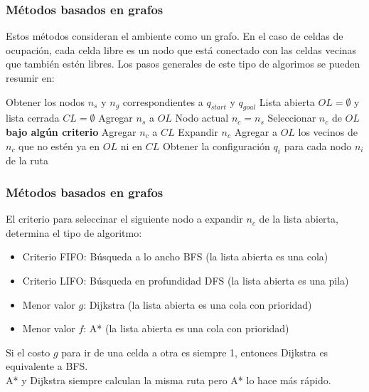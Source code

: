 \begin{frame}\frametitle{Métodos basados en grafos}
  Estos métodos consideran el ambiente como un grafo. En el caso de celdas de ocupación, cada celda libre es un nodo que está conectado con las celdas vecinas que también estén libres. Los pasos generales de este tipo de algorimos se pueden resumir en:
  \[\]
  \begin{algorithm}[H]
    \footnotesize
    \DontPrintSemicolon
    Obtener los nodos $n_s$ y $n_g$ correspondientes a $q_{start}$ y $q_{goal}$\;
    Lista abierta $OL = \emptyset$ y lista cerrada $CL = \emptyset$\;
    Agregar $n_s$ a $OL$\;
    Nodo actual $n_c = n_s$\;
    {
      Seleccionar $n_c$ de $OL$ \textbf{bajo algún criterio}\;
      Agregar $n_c$ a $CL$\;
      Expandir $n_c$\;
      Agregar a $OL$ los vecinos de $n_c$ que no estén ya en $OL$ ni en $CL$\;
    }
    Obtener la configuración $q_i$ para cada nodo $n_i$ de la ruta\;
  \end{algorithm}
\end{frame}

\begin{frame}\frametitle{Métodos basados en grafos}
  El criterio para seleccinar el siguiente nodo a expandir $n_c$ de la lista abierta, determina el tipo de algoritmo:
  \begin{itemize}
  \item Criterio FIFO: Búsqueda a lo ancho BFS (la lista abierta es una cola)
  \item Criterio LIFO:  Búsqueda en profundidad DFS (la lista abierta es una pila)
  \item Menor valor $g$: Dijkstra (la lista abierta es una cola con prioridad)
  \item Menor valor $f$: A* (la lista abierta es una cola con prioridad)
  \end{itemize}
  Si el costo $g$ para ir de una celda a otra es siempre 1, entonces Dijkstra es equivalente a BFS. \\
  A* y Dijkstra siempre calculan la misma ruta pero A* lo hace más rápido. 
\end{frame}

